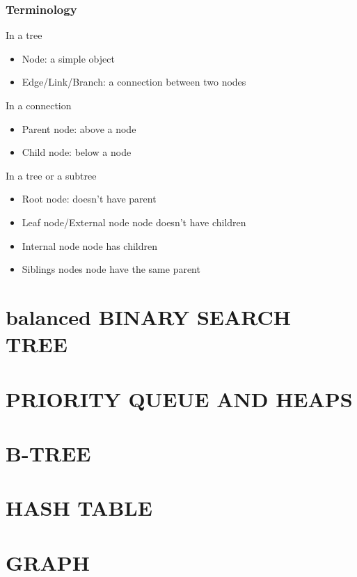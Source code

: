 \documentclass{article}
\begin{document}
\subsubsection{Terminology}
In a tree
\begin{itemize}
    \item Node: a simple object
    \item Edge/Link/Branch: a connection between two nodes
\end{itemize}

In a connection
\begin{itemize}
    \item Parent node: above a node
    \item Child node: below a node
\end{itemize}

In a tree or a subtree
\begin{itemize}
    \item Root node: doesn't have parent
    \item Leaf node/External node node doesn't have children
    \item Internal node node has children
    \item Siblings nodes node have the same parent
\end{itemize}

\section{balanced BINARY SEARCH TREE}
\section{PRIORITY QUEUE AND HEAPS}
\section{B-TREE}
\section{HASH TABLE}
\section{GRAPH}
\end{document}

